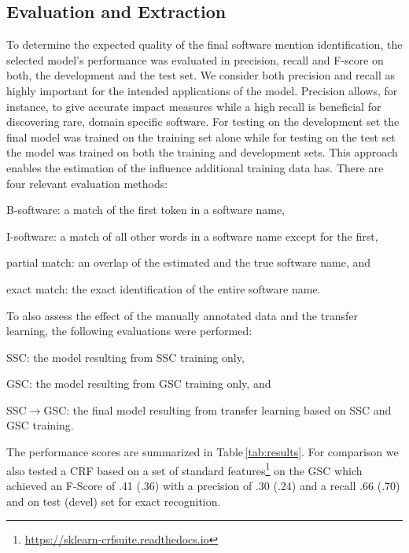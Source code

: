 \documentclass[runningheads]{llncs}
\newcommand{\tabref}[1]{Table\,\ref{#1}}
\begin{document}
\subsection{Evaluation and Extraction}
To determine the expected quality of the final software mention identification, the selected model's performance was evaluated in precision, recall and F-score on both, the development and the test set.
We consider both precision and recall as highly important for the intended applications of the model. 
Precision allows, for instance, to give accurate impact measures while a high recall is beneficial for discovering rare, domain specific software. 
For testing on the development set the final model was trained on the training set alone while for testing on the test set the model was trained on both the training and development sets. 
This approach enables the estimation of the influence additional training data has. 
There are four relevant evaluation methods:
\begin{inparaenum}[1.)]
    \item B-software: a match of the first token in a software name,
    \item I-software: a match of all other words in a software name except for the first, 
    \item partial match: an overlap of the estimated and the true software name, and
    \item exact match: the exact identification of the entire software name. 
\end{inparaenum}
To also assess the effect of the manually annotated data and the transfer learning, the following evaluations were performed:
\begin{inparaenum}[1.)]
    \item SSC: the model resulting from SSC training only,
    \item GSC: the model resulting from GSC training only, and 
    \item SSC$\rightarrow$GSC: the final model resulting from transfer learning based on SSC and GSC training.
\end{inparaenum}
The performance scores are summarized in \tabref{tab:results}.
For comparison we also tested a CRF based on a set of standard features\footnote{\url{https://sklearn-crfsuite.readthedocs.io}} on the GSC which achieved an F-Score of .41 (.36) with a precision of .30 (.24) and a recall .66 (.70) and  on test (devel) set for exact recognition. 
\end{document}
